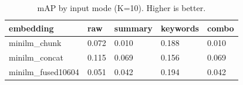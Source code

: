 \begin{table}
\caption{mAP by input mode (K=10). Higher is better.}
\label{tab:map-by-mode}
\begin{tabular}{lllll}
\toprule
embedding & raw & summary & keywords & combo \\
\midrule
minilm_chunk & 0.072 & 0.010 & 0.188 & 0.010 \\
minilm_concat & 0.115 & 0.069 & 0.156 & 0.069 \\
minilm_fused10604 & 0.051 & 0.042 & 0.194 & 0.042 \\
\bottomrule
\end{tabular}
\end{table}
